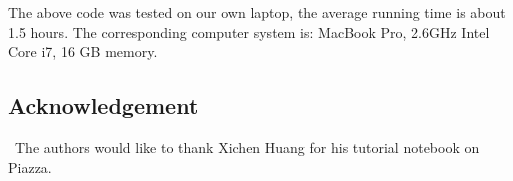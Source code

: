 \documentclass[12pt]{article}
\begin{document}
The above code was tested on our own laptop, the average running time is about 1.5 hours. The corresponding computer system is:
MacBook Pro, 2.6GHz Intel Core i7, 16 GB memory.  

\subsection*{Acknowledgement}


\quad\ The authors would like to thank Xichen Huang for his tutorial notebook on Piazza.

\vfill\pagebreak

%
\end{document}
